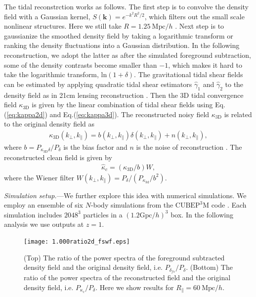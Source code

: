 \documentclass[aps,prl,twocolumn,showpacs,superscriptaddress,groupedaddress,nofootinbib]{revtex4}  %
\newcommand{\mr}{\mathrm}
\begin{document}
The tidal reconstrction works as follows. The first step is to convolve
the density field with a Gaussian kernel, $S(\bm{k})=e^{-k^2R^2/2}$, which
filters out the small scale nonlinear structures.
Here we still take $R=1.25\ \mr{Mpc}/h$ \cite{2012:pen}\cite{2015:zhu}.
Next step is to gaussianize the smoothed density field by taking a logarithmic
transform or ranking the density fluctuations into a Gaussian distribution.
In the following reconstruction, we adopt the latter as after the simulated
foreground subtraction, some of the density contrasts become smaller than $-1$,
which makes it hard to take the logarithmic transform, $\mathrm{ln}(1+\delta)$.
The gravitational tidal shear fields can be estimated by applying quadratic 
tidal shear estimators $\hat{\gamma}_1$ and $\hat{\gamma}_2$ to the density 
field as in 21cm lensing reconstruction \cite{2008:lu}. 
Then the 3D tidal convergence field $\kappa_\mr{3D}$ is given by the linear 
combination of tidal shear fields using Eq.(\ref{eq:kappa2d}) and 
Eq.(\ref{eq:kappa3d}).
The reconstructed noisy field $\kappa_\mr{3D}$ is related to the original 
density field as 
\begin{eqnarray}
\kappa_\mr{3D}(k_\perp,k_\parallel)=b(k_\perp,k_\parallel)
\delta(k_\perp,k_\parallel)+n(k_\perp,k_\parallel),
\end{eqnarray}
where $b=P_{\kappa_\mr{3D}\delta}/P_{\delta}$ is the bias factor and $n$ is 
the noise of reconstruction \cite{2015:zhu}. 
The reconstructed clean field is given by 
\begin{eqnarray}
\label{eq:kapc}
\hat{\kappa}_c=({\kappa_\mr{3D}}/{b})W,
\end{eqnarray}
where the Wiener filter $W(k_\perp,k_\parallel)=
P_\delta/(P_{\kappa_\mr{3d}}/b^2)$.

{\it Simulation setup.}---We further explore this idea with numerical 
simulations. We employ an ensemble of six $N$-body simulations from the
$\mr{CUBEP}^3\mr{M}$ code \cite{2013:code}. 
Each simulation includes $2048^3$ particles in a $(1.2\mr{Gpc}/h)^3$ box. 
In the following analysis we use outputs at $z=1$.

\begin{figure}[tbp]
\begin{center}
\texttt{[image: 1.000ratio2d\_fswf.eps]}
\end{center}
\vspace{-0.7cm}
\caption{(Top) The ratio of the power spectra of the 
foreground subtracted density field and the original density field, i.e. 
$P_{\delta_{fs}}/P_\delta$. 
(Bottom) The ratio of the power spectra of the reconstructed 
field and the original density field, i.e. $P_{\kappa_c}/P_\delta$.
Here we show results for $R_\parallel=60\ \mr{Mpc}/h$.}
\label{fig:ratio}
\end{figure}
\end{document}
